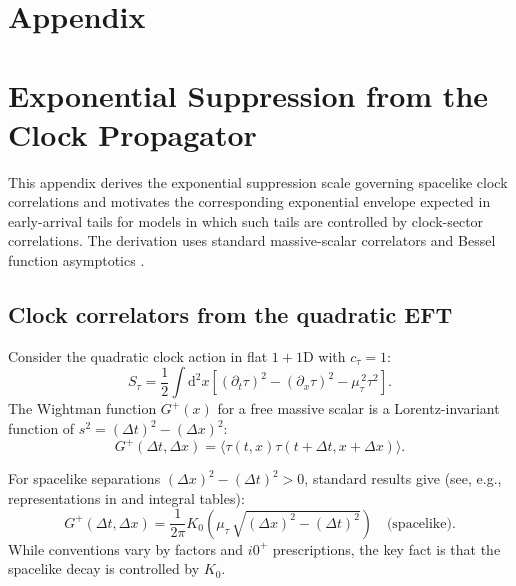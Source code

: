 \documentclass[11pt, a4paper]{article}
\theoremstyle{definition}
\theoremstyle{plain}
\theoremstyle{remark}
\numberwithin{equation}{section}
\newcommand{\dd}{\mathrm{d}}
\newcommand{\Gplus}{G^{+}}
\newcommand{\Kzero}{K_{0}}
\begin{document}
        \appendix
    \section*{Appendix}
    \section{Exponential Suppression from the Clock Propagator}
    \label{app:prop}
    
    This appendix derives the exponential suppression scale governing spacelike clock correlations and motivates the corresponding exponential envelope expected in early-arrival tails for models in which such tails are controlled by clock-sector correlations. The derivation uses standard massive-scalar correlators and Bessel function asymptotics \cite{Peskin1995,Weinberg1995,GradshteynRyzhik}.
    
    \subsection{Clock correlators from the quadratic EFT}
        
        Consider the quadratic clock action in flat $1+1$D with $c_\tau=1$:
        \begin{equation}
            S_\tau=\frac12\int \dd^2x\left[(\partial_t\tau)^2-(\partial_x\tau)^2-\mu_{\tau}^{\,2}\tau^2\right].
        \end{equation}
        The Wightman function $\Gplus(x)$ for a free massive scalar is a Lorentz-invariant function of $s^2=(\Delta t)^2-(\Delta x)^2$:
        \begin{equation}
            \Gplus(\Delta t,\Delta x)=\langle \tau(t,x)\tau(t+\Delta t,x+\Delta x)\rangle.
        \end{equation}
        
        For spacelike separations $(\Delta x)^2-(\Delta t)^2>0$, standard results give (see, e.g., representations in \cite{Weinberg1995} and integral tables):
        \begin{equation}
            \Gplus(\Delta t,\Delta x)
            =\frac{1}{2\pi}\Kzero\!\left(\mu_\tau\,\sqrt{(\Delta x)^2-(\Delta t)^2}\right)
            \quad\text{(spacelike)}.
            \label{eq:WightmanK0}
        \end{equation}
        While conventions vary by factors and $i0^+$ prescriptions, the key fact is that the spacelike decay is controlled by $\Kzero$.
    
\end{document}

